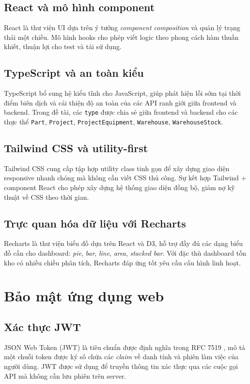 \subsection{React và mô hình component}
React \cite{reactDoc} là thư viện UI dựa trên ý tưởng \emph{component composition} và quản lý trạng thái một chiều. Mô hình hooks cho phép viết logic theo phong cách hàm thuần khiết, thuận lợi cho test và tái sử dụng.

\subsection{TypeScript và an toàn kiểu}
TypeScript bổ sung hệ kiểu tĩnh cho JavaScript, giúp phát hiện lỗi sớm tại thời điểm biên dịch và cải thiện độ an toàn của các API ranh giới giữa frontend và backend. Trong đề tài, các \texttt{type} được chia sẻ giữa frontend và backend cho các thực thể \texttt{Part}, \texttt{Project}, \texttt{ProjectEquipment}, \texttt{Warehouse}, \texttt{WarehouseStock}.

\subsection{Tailwind CSS và utility-first}
Tailwind CSS \cite{tailwindDoc} cung cấp tập hợp utility class tinh gọn để xây dựng giao diện responsive nhanh chóng mà không cần viết CSS thủ công. Sự kết hợp Tailwind + component React cho phép xây dựng hệ thống giao diện đồng bộ, giảm nợ kỹ thuật về CSS theo thời gian.

\subsection{Trực quan hóa dữ liệu với Recharts}
Recharts là thư viện biểu đồ dựa trên React và D3, hỗ trợ đầy đủ các dạng biểu đồ cần cho dashboard: \emph{pie}, \emph{bar}, \emph{line}, \emph{area}, \emph{stacked bar}. Với đặc thù dashboard tồn kho có nhiều chiều phân tích, Recharts đáp ứng tốt yêu cầu cấu hình linh hoạt.

\section{Bảo mật ứng dụng web}
\label{sec:security}

\subsection{Xác thực JWT}
JSON Web Token (JWT) là tiêu chuẩn được định nghĩa trong RFC 7519 \cite{rfc7519}, mô tả một chuỗi token được ký số chứa các \emph{claim} về danh tính và phiên làm việc của người dùng. JWT được sử dụng để truyền thông tin xác thực qua các cuộc gọi API mà không cần lưu phiên trên server.

